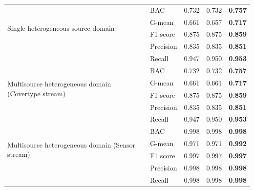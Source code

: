 \begin{table}[H]
{\begin{tabular}{|l|l|c|c|c|}
  \multirow{4}{*}{Single heterogeneous source domain} & BAC         & 0.732          & 0.732         & \textbf{0.757} \\ \cline{2-5} 
                                                 & G-mean          & 0.661          & 0.657         & \textbf{0.717} \\ \cline{2-5} 
                                                 & F1 score        & 0.875          & 0.875         & \textbf{0.859} \\ \cline{2-5} 
                                                 & Precision       & 0.835          & 0.835         & \textbf{0.851} \\ \cline{2-5} 
                                                 & Recall          & 0.947          & 0.950         & \textbf{0.953} \\ \hline
  \multirow{4}{*}{Multisource heterogeneous domain (Covertype stream)} & BAC & 0.732  & 0.732         & \textbf{0.757} \\ \cline{2-5} 
                                                 & G-mean          & 0.661          & 0.661         & \textbf{0.717} \\ \cline{2-5} 
                                                 & F1 score        & 0.875          & 0.875         & \textbf{0.859} \\ \cline{2-5} 
                                                 & Precision       & 0.835          & 0.835         & \textbf{0.851} \\ \cline{2-5} 
                                                 & Recall          & 0.947          & 0.950         & \textbf{0.953} \\ \hline
  \multirow{4}{*}{Multisource heterogeneous domain (Sensor stream)} & BAC & 0.998  & 0.998         & \textbf{0.998} \\ \cline{2-5} 
                                                 & G-mean          & 0.971          & 0.971         & \textbf{0.992} \\ \cline{2-5} 
                                                 & F1 score        & 0.997          & 0.997         & \textbf{0.997} \\ \cline{2-5} 
                                                 & Precision       & 0.998          & 0.998         & \textbf{0.998} \\ \cline{2-5} 
                                                 & Recall          & 0.998          & 0.998         & \textbf{0.998} \\ \hline
  \end{tabular}
  }

  \label{table:6_table2}
  \end{table}

